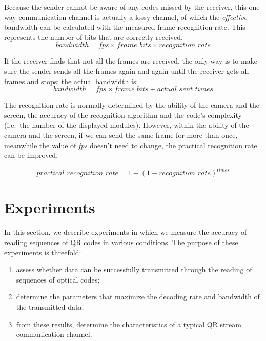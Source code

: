 Because the sender cannot be aware of any codes missed by the receiver, this one-way communication channel is actually a lossy channel, of which the \emph{effective} bandwidth can be calculated with the measured frame recognition rate. This represents the number of bits that are correctly received.
%
\begin{equation*}
  bandwidth = \mathit{fps} \times \mathit{frame\_bits} \times \mathit{recognition\_rate}
\end{equation*}

If the receiver finds that not all the frames are received, the only way is to make sure the sender sends all the frames again and again until the receiver gets all frames and stops; the actual bandwidth is:
%
\begin{equation*}
  bandwidth = \mathit{fps} \times \mathit{frame\_bits} \div \mathit{actual\_sent\_times}
\end{equation*}

The recognition rate is normally determined by the ability of the camera and the screen, the accuracy of the recognition algorithm and the code's complexity (i.e.\ the number of the displayed modules). However, within the ability of the camera and the screen, if we can send the same frame for more than once, meanwhile the value of \emph{fps} doesn't need to change, the practical recognition rate can be improved.

\begin{equation*}
\mathit{practical\_recognition\_rate} = 1 - (1 - \mathit{recognition\_rate})^{times}
\end{equation*}



\section{Experiments}\label{sec:qr:experiments} %

In this section, we describe experiments in which we measure the accuracy of reading sequences of QR codes in various conditions. The purpose of these experiments is threefold:

\begin{enumerate}
\item assess whether data can be successfully transmitted through the reading of sequences of optical codes;
\item determine the parameters that maximize the decoding rate and bandwidth of the transmitted data;
\item from these results, determine the characteristics of a typical QR stream communication channel.
\end{enumerate}

